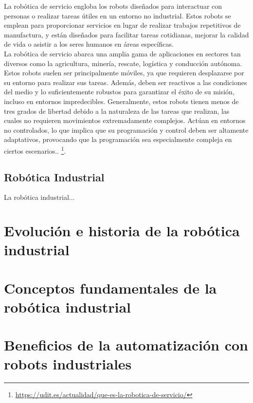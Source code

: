 La robótica de servicio engloba los robots diseñados para interactuar con personas o realizar tareas útiles en un entorno no industrial. Estos robots se emplean para proporcionar servicios en lugar de realizar trabajos repetitivos de manufactura, y están diseñados para facilitar tareas cotidianas, mejorar la calidad de vida o asistir a los seres humanos en áreas específicas. \\

La robótica de servicio abarca una amplia gama de aplicaciones en sectores tan diversos como la agricultura, minería, rescate, logística y conducción autónoma. Estos robots suelen ser principalmente móviles, ya que requieren desplazarse por su entorno para realizar sus tareas. Además, deben ser reactivos a las condiciones del medio y lo suficientemente robustos para garantizar el éxito de su misión, incluso en entornos impredecibles. Generalmente, estos robots tienen menos de tres grados de libertad debido a la naturaleza de las tareas que realizan, las cuales no requieren movimientos extremadamente complejos. Actúan en entornos no controlados, lo que implica que su programación y control deben ser altamente adaptativos, provocando que la programación sea especialmente compleja en ciertos escenarios.. \footnote{\url{https://udit.es/actualidad/que-es-la-robotica-de-servicio/}}. \\


\subsection{Robótica Industrial}

La robótica industrial... \\

\section{Evolución e historia de la robótica industrial}
\label{sec:segundaseccion}

\section{Conceptos fundamentales de la robótica industrial}
\label{sec:terceraseccion}

\section{Beneficios de la automatización con robots industriales}
\label{sec:cuartaseccion}


